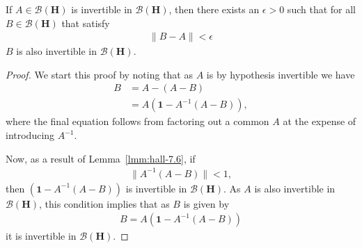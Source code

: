 \begin{lemma}
    \label{lmm:hall-prblm-7.4.8}
    \leanok
    If $A \in \mathcal{B}(\mathbf{H})$ is invertible in $\mathcal{B}(\mathbf{H})$, then there exists an $\epsilon > 0$ such that for all $B \in \mathcal{B}(\mathbf{H})$ that satisfy
    \begin{align}
        \|B - A\| < \epsilon
    \end{align}
    $B$ is also invertible in $\mathcal{B}(\mathbf{H})$.
\end{lemma}
\begin{proof}
    \leanok
We start this proof by noting that as $A$ is by hypothesis invertible we have
\begin{align}
    B &= A - (A - B) \\
      &= A (\mathbf{1} - A^{-1}(A - B)),
\end{align}
where the final equation follows from factoring out a common $A$ at the expense of introducing $A^{-1}$.

Now, as a result of Lemma~\ref{lmm:hall-7.6}, if
\begin{align}
    \|A^{-1}(A - B)\| < 1,
\end{align}
then $(\mathbf{1} - A^{-1}(A - B))$ is invertible in $\mathcal{B}(\mathbf{H})$. As $A$ is also invertible in $\mathcal{B}(\mathbf{H})$, this condition implies that as $B$ is given by
\begin{align}
    B = A (\mathbf{1} - A^{-1}(A - B))
\end{align}
it is invertible in $\mathcal{B}(\mathbf{H})$.


\end{proof}
